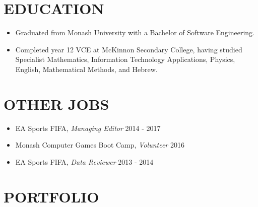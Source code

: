 \documentclass[margin, 11pt]{res} %
\begin{document}
\begin{resume}

\section{EDUCATION}

\begin{itemize}

\item Graduated from  Monash University with a Bachelor of Software Engineering.
\item Completed year 12 VCE at McKinnon Secondary College, having studied Specialist  Mathematics, Information Technology Applications, Physics, English, Mathematical Methods, and Hebrew.

\end{itemize}


\section{OTHER JOBS} 

\begin{itemize} \itemsep -11pt

\item EA Sports FIFA, {\sl Managing Editor} \hfill 2014 - 2017\\
\item Monash Computer Games Boot Camp, {\sl Volunteer} \hfill 2016 \\
\item EA Sports FIFA, {\sl Data Reviewer} \hfill 2013 - 2014 \\
 
\end{itemize}




\section{PORTFOLIO} 


\end{resume}
\end{document}
